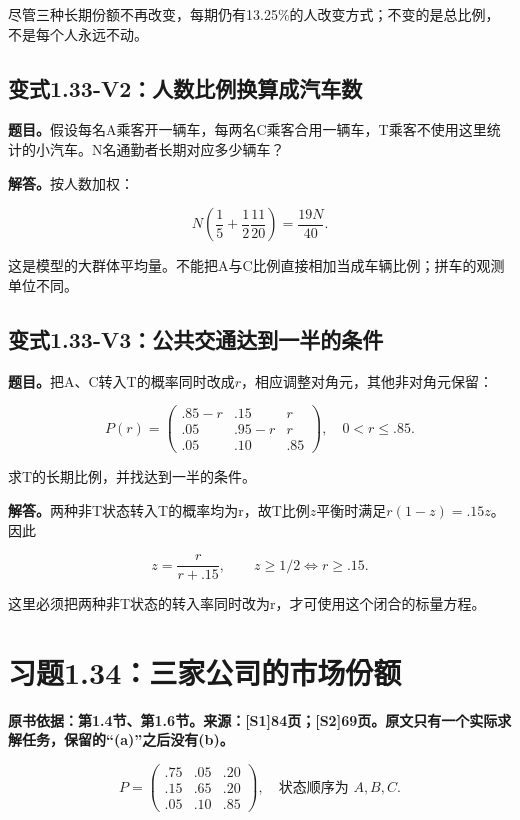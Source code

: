 \documentclass[
  11pt,
  a4paper,
  UTF8,
  fontset=fandol]{ctexart}
\begin{document}
尽管三种长期份额不再改变，每期仍有13.25\%的人改变方式；不变的是总比例，不是每个人永远不动。

\subsection{变式1.33-V2：人数比例换算成汽车数}\label{ux53d8ux5f0f1.33-v2ux4ebaux6570ux6bd4ux4f8bux6362ux7b97ux6210ux6c7dux8f66ux6570}

\textbf{题目。}假设每名A乘客开一辆车，每两名C乘客合用一辆车，T乘客不使用这里统计的小汽车。N名通勤者长期对应多少辆车？

\textbf{解答。}按人数加权：

\[
N\left(\frac15+\frac12\frac{11}{20}\right)
=\boxed{\frac{19N}{40}}.
\]

这是模型的大群体平均量。不能把A与C比例直接相加当成车辆比例；拼车的观测单位不同。

\subsection{变式1.33-V3：公共交通达到一半的条件}\label{ux53d8ux5f0f1.33-v3ux516cux5171ux4ea4ux901aux8fbeux5230ux4e00ux534aux7684ux6761ux4ef6}

\textbf{题目。}把A、C转入T的概率同时改成\(r\)，相应调整对角元，其他非对角元保留：

\[
P(r)=\begin{pmatrix}.85-r&.15&r\\.05&.95-r&r\\.05&.10&.85\end{pmatrix},
\quad0<r\le.85.
\]

求T的长期比例，并找达到一半的条件。

\textbf{解答。}两种非T状态转入T的概率均为r，故T比例\(z\)平衡时满足\(r(1-z)=.15z\)。因此

\[
\boxed{z=\frac{r}{r+.15},\qquad z\ge1/2\iff r\ge.15.}
\]

这里必须把两种非T状态的转入率同时改为r，才可使用这个闭合的标量方程。

\section{习题1.34：三家公司的市场份额}\label{ux4e60ux98981.34ux4e09ux5bb6ux516cux53f8ux7684ux5e02ux573aux4efdux989d}

\textbf{原书依据：第1.4节、第1.6节。来源：{[}S1{]}84页；{[}S2{]}69页。原文只有一个实际求解任务，保留的``(a)''之后没有(b)。}

\[
P=\begin{pmatrix}.75&.05&.20\\.15&.65&.20\\.05&.10&.85\end{pmatrix},
\quad\text{状态顺序为 }A,B,C.
\]
\end{document}
